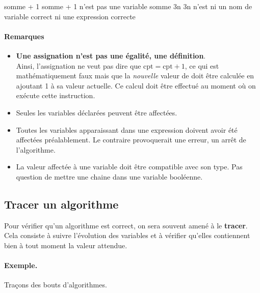 				\begin{wrong}
					\begin{LDA}
					\Let somme + 1 
					\RComment somme + 1 n’est pas une variable
					\Let somme \Gets 3n
					\RComment 3n n’est ni un nom de variable correct ni une expression correcte
					\end{LDA}
				\end{wrong}
				
			\paragraph{Remarques}
			
				\begin{itemize}
				\item 
					\textbf{Une assignation n'est pas une égalité, une définition}.
					\\Ainsi, l'assignation 
					ne veut pas dire que $\textrm{cpt} = \textrm{cpt} + 1$,
					ce qui est mathématiquement faux 
					mais que la \emph{nouvelle} valeur de 
					doit être calculée en ajoutant 1 à sa valeur actuelle.
					Ce calcul doit être effectué au moment 
					où on exécute cette instruction. 
				\item 
					Seules les variables déclarées peuvent être affectées.
				\item 
					Toutes les variables apparaissant dans une expression
					doivent avoir été affectées préalablement. 
					Le contraire provoquerait une erreur,
					un arrêt de l’algorithme.
				\item 
					La valeur affectée à une variable 
					doit être compatible avec son type.
					Pas question de mettre une chaine dans une variable
					booléenne.
				\end{itemize}
				
		\subsection{Tracer un algorithme}
		
			Pour vérifier qu'un algorithme est correct,
			on sera souvent amené à le \textbf{tracer}.
			Cela consiste à suivre l'évolution des variables
			et à vérifier qu'elles contiennent bien à tout moment
			la valeur attendue.
			
			\paragraph{Exemple.} Traçons des bouts d'algorithmes.
			
